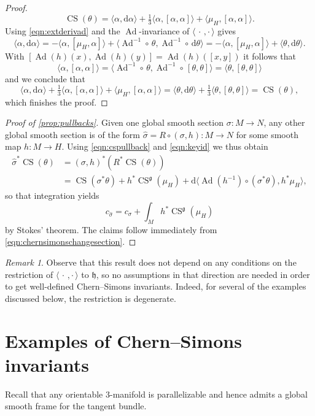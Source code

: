 \documentclass[british,11pt,a4paper]{amsart}
\numberwithin{equation}{section}
\renewcommand\frak{\mathfrak}
\newcommand{\si}{\sigma}
\newcommand{\B}[2]{\langle#1,#2\rangle}
\newcommand{\CS}{\operatorname{CS}}
\newcommand{\Ad}{\operatorname{Ad}}
\renewcommand*{\d}{\mathrm{d}}
\newcommand{\col}{:}
\newcounter{theorem}
\numberwithin{theorem}{section}
\theoremstyle{definition}
\theoremstyle{remark}
\newtheorem{remark}[theorem]{Remark}
\begin{document}
\begin{proof}
\[
\CS(\theta)=\B{\alpha}{\d \alpha}+\tfrac{1}{3}\B{\alpha}{[\alpha,\alpha]}+\B{\mu_H}{[\alpha,\alpha]}.
\] 
Using \eqref{eqn:extderivad} and the $\Ad$-invariance of $\B{\,\cdot\,}{\cdot\,}$ gives
\[
\B{\alpha}{\d\alpha}=-\B{\alpha}{[\mu_H,\alpha]}+\B{\Ad^{-1}\circ\, \theta}{\Ad^{-1}\circ\, \d\theta}=-\B{\alpha}{[\mu_H,\alpha]}+\B{\theta}{\d\theta}.
\]
With $[\Ad(h)(x),\Ad(h)(y)]=\Ad(h)([x,y])$ it follows that
\[
\B{\alpha}{[\alpha,\alpha]}=\B{\Ad^{-1}\circ\, \theta}{\Ad^{-1}\circ\, [\theta,\theta]}=\B{\theta}{[\theta,\theta]}
\]
and we conclude that
\[
\B{\alpha}{\d \alpha}+\tfrac{1}{3}\B{\alpha}{[\alpha,\alpha]}+\B{\mu_H}{[\alpha,\alpha]}=\B{\theta}{\d\theta}+\tfrac{1}{3}\B{\theta}{[\theta,\theta]}=\CS(\theta),
\]
which finishes the proof. 
\end{proof}
\begin{proof}[Proof of \cref{prop:pullbacks}]
Given one global smooth section $\si\col M\to N$, any other global smooth section is of the form $\hat{\sigma}=R\circ (\sigma,h) \col M \to N$ for some smooth map $h \col M \to H$. Using \eqref{eqn:cspullback} and \eqref{eqn:keyid} we thus obtain
\[
\begin{aligned}
\hat{\sigma}^*\CS(\theta)&=(\sigma,h)^*\left(R^*\CS(\theta)\right)\\
&=\CS(\sigma^*\theta)+h^*\CS^{\frak g}(\mu_H)+\d\B{\Ad(h^{-1})\circ(\sigma^*\theta)}{h^*\mu_H},
\end{aligned}
\]
so that integration yields
\begin{equation}\label{eqn:chernsimonschangesection}
c_{\hat{\sigma}}=c_{\sigma}+\int_M h^*\CS^{\frak g}(\mu_H)
\end{equation}
by Stokes' theorem. The claims follow immediately from \eqref{eqn:chernsimonschangesection}. 
\end{proof}

\begin{remark}
Observe that this result does not depend on any conditions on the restriction of
$\B{\,\cdot\,}{\cdot\,}$ to $\frak{h}$, so no assumptions in that direction are
needed in order to get well-defined Chern--Simons invariants. Indeed, for several of
the examples discussed below, the restriction is degenerate.
\end{remark}

\section{Examples of Chern--Simons invariants}\label{1.4}
Recall that any orientable $3$-manifold is parallelizable and hence admits a global smooth frame for the tangent bundle.
\end{document}
